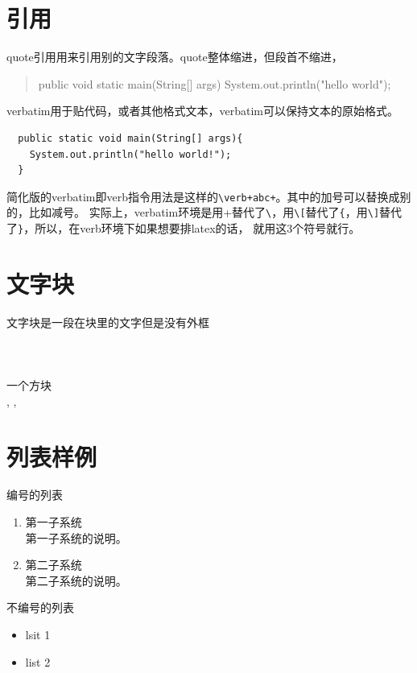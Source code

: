 \documentclass[a4paper,12pt]{article} %
\begin{document}
 \section{引用}
 quote引用用来引用别的文字段落。quote整体缩进，但段首不缩进，
 \begin{quote}
   public void static main(String[] args){
     System.out.println("hello world");
   }
  \end{quote}
 
 verbatim用于贴代码，或者其他格式文本，verbatim可以保持文本的原始格式。
\begin{verbatim}
  public static void main(String[] args){
    System.out.println("hello world!");
  }
\end{verbatim}
 简化版的verbatim即verb指令用法是这样的\verb-\verb+abc+-。其中的加号可以替换成别的，比如减号。
 实际上，verbatim环境是用+替代了\verb-\-，用\verb-\[-替代了\verb-{-，用\verb-\]-替代了\verb-}-，所以，在verb环境下如果想要排latex的话， 就用这3个符号就行。


 \section{文字块}
 \mbox{文字块是一段在块里的文字\\但是没有外框}\\
 \\
 \\
 \\
 一个方块
 \framebox{\rule{3mm}{0pt}\rule{0pt}{3mm}}\\
 \newsavebox{\savbox}
 \usebox{\savbox}, \usebox{\savbox}, \usebox{\savbox}\\

 
 \section{列表样例}
 编号的列表
 \begin{enumerate}
  \item 第一子系统\\
  第一子系统的说明。
  \item 第二子系统\\
  第二子系统的说明。
 \end{enumerate}

 不编号的列表
 \begin{itemize} %
 \item lsit 1
 \item list 2
 \end{itemize}
\end{document}
